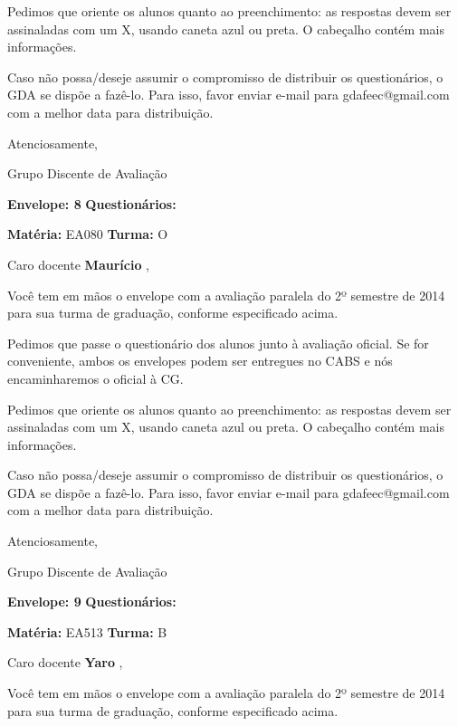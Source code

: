 \documentclass[a5paper]{letter}
\begin{document}
Pedimos que oriente os alunos quanto ao preenchimento: as respostas devem ser assinaladas com um X, usando caneta azul ou preta. O cabeçalho contém mais informações.

	Caso não possa/deseje assumir o compromisso de distribuir os questionários, o GDA se dispõe a fazê-lo. Para isso, favor enviar e-mail para gdafeec@gmail.com com a melhor data para distribuição.


Atenciosamente, 

Grupo Discente de Avaliação

\vspace{0.5cm}

{\bf Envelope: 8 }		\hfill	{\bf Questionários:} \hspace{2cm}

\newpage
\thispagestyle{empty}

\hfill {\bf Matéria:} EA080 {\bf Turma:} O

Caro docente {\bf Maurício }, 

	Você tem em mãos o envelope com a avaliação paralela do 2º semestre de 2014 para sua turma de graduação, conforme especificado acima.

	Pedimos que passe o questionário dos alunos junto à avaliação oficial. Se for conveniente, ambos os envelopes podem ser entregues no CABS e nós encaminharemos o oficial à CG.

Pedimos que oriente os alunos quanto ao preenchimento: as respostas devem ser assinaladas com um X, usando caneta azul ou preta. O cabeçalho contém mais informações.

	Caso não possa/deseje assumir o compromisso de distribuir os questionários, o GDA se dispõe a fazê-lo. Para isso, favor enviar e-mail para gdafeec@gmail.com com a melhor data para distribuição.


Atenciosamente, 

Grupo Discente de Avaliação

\vspace{0.5cm}

{\bf Envelope: 9 }		\hfill	{\bf Questionários:} \hspace{2cm}

\newpage
\thispagestyle{empty}

\hfill {\bf Matéria:} EA513 {\bf Turma:} B

Caro docente {\bf Yaro }, 

	Você tem em mãos o envelope com a avaliação paralela do 2º semestre de 2014 para sua turma de graduação, conforme especificado acima.
\end{document}
